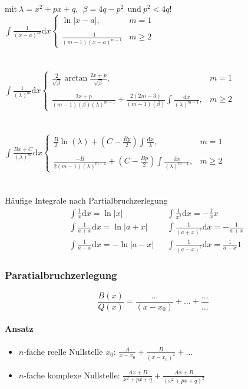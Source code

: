 \documentclass[6pt,a4paper]{scrartcl}
\newcommand{\abs}[1]{\ensuremath{\left\vert#1\right\vert}}
\begin{document}
\begin{multicols*}{4}
$\text{mit} ~ \lambda=x^2+px+q, ~~ \beta=4q-p^2 ~~ \text{und} ~p^2<4q$!
$\int\frac{1}{(x-a)^m}\mathrm dx \begin{cases} \ln\left|x-a\right|, & m=1\\ \\ \frac{-1}{(m-1)(x-a)^{m-1}} &m\geq2 \end{cases}$\\ \\ \\
$\int\frac{1}{(\lambda)^m} \mathrm dx \begin{cases} \frac{2}{\sqrt{\beta}} \arctan\frac{2x+p}{\sqrt{\beta}}, &m=1\\ \\ \frac{2x+p}{(m-1)(\beta)(\lambda)^{m-1}}+\frac{2(2m-3)}{(m-1)(\beta)} \int\frac{\mathrm dx}{(\lambda)^{m-1}}, &m\geq2 \end{cases}$\\ \\ \\
$\int\frac{Bx+C}{(\lambda)^m} \mathrm dx \begin{cases} \frac{B}{2} \ln(\lambda) + (C-\frac{Bp}{2}) \int\frac{\mathrm dx}{\lambda}, &m=1\\ \\ \frac{-B}{2(m-1)(\lambda)^{m-1}} + (C-\frac{Bp}{2}) \int\frac{\mathrm dx}{(\lambda)^{m-1}}, &m\geq2 \end{cases}$\\ \\ \\
Häufige Integrale nach Partialbruchzerlegung
\begin{align*}
&\int\frac{1}{x}\mathrm dx = \ln\abs{x}&&\int\frac{1}{x^2}\mathrm dx = -\frac{1}{x}  x \\
&\int\frac{1}{a+x}\mathrm dx = \ln\abs{a+x} && \int\frac{1}{(a+x)^2}\mathrm dx = -\frac{1}{a+x} \\
&\int\frac{1}{a-x}\mathrm dx = -\ln\abs{a-x} && \int\frac{1}{(a-x)^2}\mathrm dx = \frac{1}{a-x}1
\end{align*}
\subsubsection{Paratialbruchzerlegung}
\begin{equation*}
\frac{B(x)}{Q(x)} = \frac{\ldots}{(x - x_0)} + \ldots + \frac{\ldots}{\ldots}
\end{equation*}
\paragraph{Ansatz}
\begin{itemize}\itemsep0pt
\item $n$-fache reelle Nullstelle $x_0$: $\frac{A}{x-x_0}+\frac{B}{(x-x_0)^2} +\dots$
\item $n$-fache komplexe Nullstelle: $\frac{Ax+B}{x^2+px+q}+\frac{Ax+B}{(x^2+px+q)^2}$
\end{itemize}

\end{multicols*}
\end{document}
